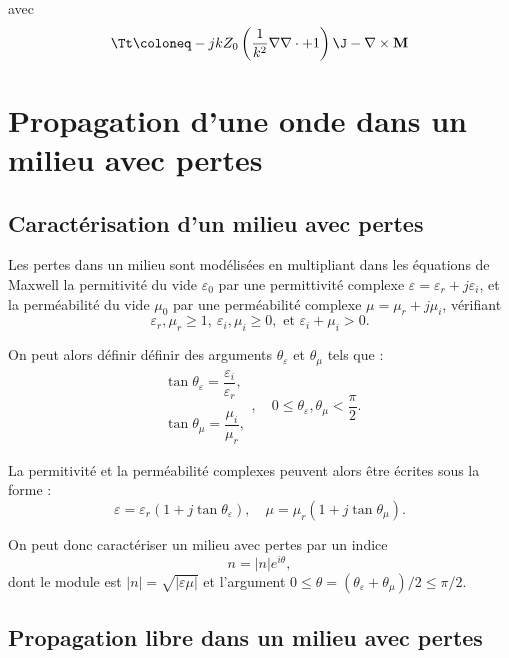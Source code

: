 avec
\begin{equation}
    \Tt \coloneq -jkZ_0\left(\frac1{k^2}\nabla\nabla\cdot+1\right)\J-\nabla\times\mathbf M
\end{equation}

\section{Propagation d'une onde dans un milieu avec pertes}

\subsection{Caractérisation d'un milieu avec pertes}
Les pertes dans un milieu sont modélisées en multipliant dans les équations de Maxwell la permitivité du vide $\varepsilon_0$ par une permittivité complexe $\varepsilon = \varepsilon_r + j\varepsilon_i$, et la perméabilité du vide $\mu_0$ par une perméabilité complexe $\mu = \mu_r + j\mu_i$, vérifiant $$\varepsilon_r,\mu_r \geq 1, \ \varepsilon_i, \mu_i \geq 0,\text{ et } \varepsilon_i+\mu_i > 0.$$

On peut alors définir définir des arguments $\theta_\varepsilon$ et $\theta_\mu$ tels que :
\begin{equation}
    \begin{array}{l}
        \tan\theta_\varepsilon = \dfrac{\varepsilon_i}{\varepsilon_r}, \\
        \\
        \tan\theta_\mu = \dfrac{\mu_i}{\mu_r},
    \end{array},\quad 0\leq \theta_\varepsilon, \theta_\mu < \frac{\pi}{2}.
\end{equation}


La permitivité et la perméabilité complexes peuvent alors être écrites sous la forme :
\begin{equation}
    \varepsilon = \varepsilon_r(1+j\tan\theta_\varepsilon), \quad \mu = \mu_r(1+j\tan\theta_\mu).
\end{equation}

On peut donc caractériser un milieu avec pertes par un indice $$n = |n|e^{i\theta},$$ dont le module est $|n| = \sqrt{|\varepsilon\mu|}$ et l'argument $0\leq\theta = \left(\theta_\varepsilon + \theta_\mu\right)/2\leq\pi/2$.

\subsection{Propagation libre dans un milieu avec pertes}

